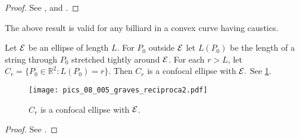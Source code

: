  \begin{proof}
 See \cite{chasles1843}, \cite[pp. 283-284]{darboux1917} and \cite[pp. 115-116]{carneiro2005}. 
 \end{proof}
 
  The  above result is valid for any billiard in a convex curve having caustics. 
 
 
      
   \begin{proposition}\label{prop:caustic} Let $\mathcal{E}$ be an ellipse of length $L$.
   For $P_0$  outside $\mathcal{E}$ let $ L(P_0)$   be the length of a string through $P_0$ stretched tightly around $\mathcal{E}$. For each $r>L$, let $C_r=\{P_0\in\mathbb{R}^2: L(P_0)=r\}.$  Then  $C_r$ is a confocal ellipse with $\mathcal{E}.$ See \cref{fig:reciproca_graves}.
      \end{proposition} 
      
       \begin{figure}
 \begin{center}
   \texttt{[image: pics\_08\_005\_graves\_reciproca2.pdf]}
		\caption{ $C_r$ is a confocal  ellipse with $\mathcal{E}$.}
		\label{fig:reciproca_graves}
 	\end{center}
\end{figure}
 \begin{proof} See \cite[page 14]{akopyan2007-conics}.
 \end{proof}